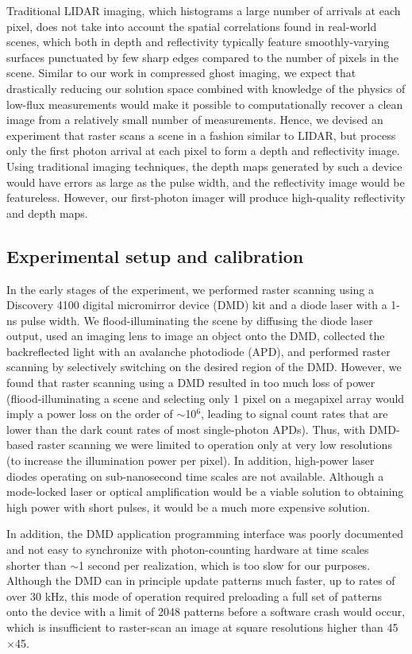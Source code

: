Traditional LIDAR imaging, which histograms a large number of arrivals at each pixel, does not take into account the spatial correlations found in real-world scenes, which both in depth and reflectivity typically feature smoothly-varying surfaces punctuated by few sharp edges compared to the number of pixels in the scene. Similar to our work in compressed ghost imaging, we expect that drastically reducing our solution space combined with knowledge of the physics of low-flux measurements would make it possible to computationally recover a clean image from a relatively small number of measurements. Hence, we devised an experiment that raster scans a scene in a fashion similar to LIDAR, but process only the first photon arrival at each pixel to form a depth and reflectivity image. Using traditional imaging techniques, the depth maps generated by such a device would have errors as large as the pulse width, and the reflectivity image would be featureless. However, our first-photon imager will produce high-quality reflectivity and depth maps.

\subsection{Experimental setup and calibration}

In the early stages of the experiment, we performed raster scanning using a Discovery 4100 digital micromirror device (DMD) kit and a diode laser with a 1-ns pulse width. We flood-illuminating the scene by diffusing the diode laser output, used an imaging lens to image an object onto the DMD, collected the backreflected light with an avalanche photodiode (APD), and performed raster scanning by selectively switching on the desired region of the DMD. However, we found that raster scanning using a DMD resulted in too much loss of power (fliood-illuminating a scene and selecting only 1 pixel on a megapixel array would imply a power loss on the order of $\sim$10$^6$, leading to signal count rates that are lower than the dark count rates of most single-photon APDs). Thus, with DMD-based raster scanning we were limited to operation only at very low resolutions (to increase the illumination power per pixel). In addition, high-power laser diodes operating on sub-nanosecond time scales are not available. Although a mode-locked laser or optical amplification would be a viable solution to obtaining high power with short pulses, it would be a much more expensive solution.

In addition, the DMD application programming interface was poorly documented and not easy to synchronize with photon-counting hardware at time scales shorter than $\sim$1 second per realization, which is too slow for our purposes. Although the DMD can in principle update patterns much faster, up to rates of over 30 kHz, this mode of operation required preloading a full set of patterns onto the device with a limit of 2048 patterns before a software crash would occur, which is insufficient to raster-scan an image at square resolutions higher than 45$\times$45.

